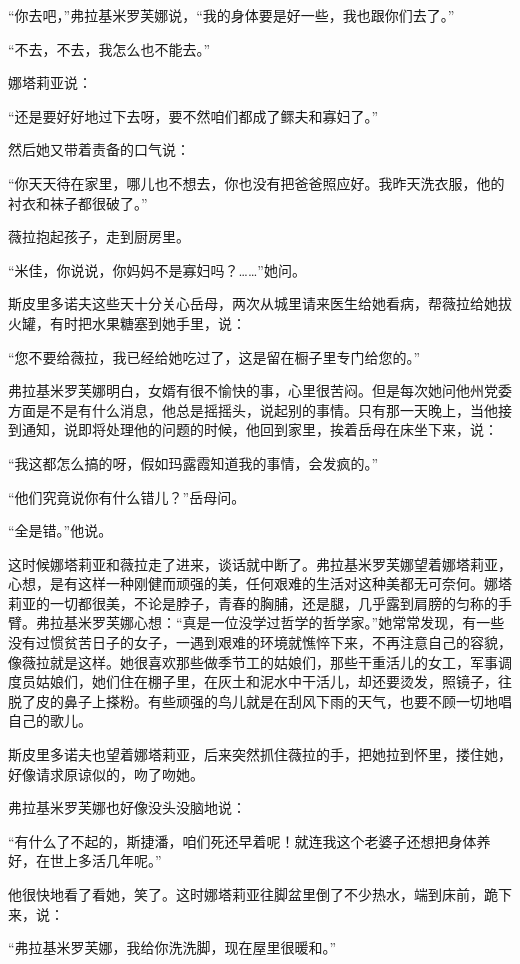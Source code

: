 “你去吧，”弗拉基米罗芙娜说，“我的身体要是好一些，我也跟你们去了。”

“不去，不去，我怎么也不能去。”

娜塔莉亚说：

“还是要好好地过下去呀，要不然咱们都成了鳏夫和寡妇了。”

然后她又带着责备的口气说：

“你天天待在家里，哪儿也不想去，你也没有把爸爸照应好。我昨天洗衣服，他的衬衣和袜子都很破了。”

薇拉抱起孩子，走到厨房里。

“米佳，你说说，你妈妈不是寡妇吗？……”她问。

斯皮里多诺夫这些天十分关心岳母，两次从城里请来医生给她看病，帮薇拉给她拔火罐，有时把水果糖塞到她手里，说：

“您不要给薇拉，我已经给她吃过了，这是留在橱子里专门给您的。”

弗拉基米罗芙娜明白，女婿有很不愉快的事，心里很苦闷。但是每次她问他州党委方面是不是有什么消息，他总是摇摇头，说起别的事情。只有那一天晚上，当他接到通知，说即将处理他的问题的时候，他回到家里，挨着岳母在床坐下来，说：

“我这都怎么搞的呀，假如玛露霞知道我的事情，会发疯的。”

“他们究竟说你有什么错儿？”岳母问。

“全是错。”他说。

这时候娜塔莉亚和薇拉走了进来，谈话就中断了。弗拉基米罗芙娜望着娜塔莉亚，心想，是有这样一种刚健而顽强的美，任何艰难的生活对这种美都无可奈何。娜塔莉亚的一切都很美，不论是脖子，青春的胸脯，还是腿，几乎露到肩膀的匀称的手臂。弗拉基米罗芙娜心想：“真是一位没学过哲学的哲学家。”她常常发现，有一些没有过惯贫苦日子的女子，一遇到艰难的环境就憔悴下来，不再注意自己的容貌，像薇拉就是这样。她很喜欢那些做季节工的姑娘们，那些干重活儿的女工，军事调度员姑娘们，她们住在棚子里，在灰土和泥水中干活儿，却还要烫发，照镜子，往脱了皮的鼻子上搽粉。有些顽强的鸟儿就是在刮风下雨的天气，也要不顾一切地唱自己的歌儿。

斯皮里多诺夫也望着娜塔莉亚，后来突然抓住薇拉的手，把她拉到怀里，搂住她，好像请求原谅似的，吻了吻她。

弗拉基米罗芙娜也好像没头没脑地说：

“有什么了不起的，斯捷潘，咱们死还早着呢！就连我这个老婆子还想把身体养好，在世上多活几年呢。”

他很快地看了看她，笑了。这时娜塔莉亚往脚盆里倒了不少热水，端到床前，跪下来，说：

“弗拉基米罗芙娜，我给你洗洗脚，现在屋里很暖和。”

